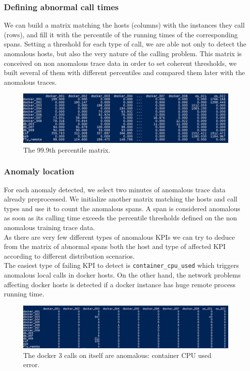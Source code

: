 \documentclass[acmsmall, screen, nonacm]{acmart}
\begin{document}
\subsubsection*{Defining abnormal call times}
We can build a matrix matching the hosts (columns) with the instances they call (rows), and fill it with the percentile of the running times of the corresponding spans. Setting a threshold for each type of call, we are able not only to detect the anomalous hosts, but also the very nature of the calling problem. This matrix is conceived on non anomalous trace data in order to set coherent thresholds, we built several of them with different percentiles and compared them later with the anomalous traces.

\begin{figure}[h!]
  \centering
  \includegraphics[width=\textwidth]{images/Percentile_matrix.png}
  \caption{The 99.9th percentile matrix.}
  \label{fig:Percentile_matrix}
\end{figure}

\subsubsection*{Anomaly location}
For each anomaly detected, we select two minutes of anomalous trace data already preprocessed. We initialize another matrix matching the hosts and call types and use it to count the anomalous spans. A span is considered anomalous as soon as its calling time exceeds the percentile thresholds defined on the non anomalous training trace data.
\\
As there are very few different types of anomalous KPIs we can try to deduce from the matrix of abnormal spans both the host and type of affected KPI according to different distribution scenarios.
\\
The easiest type of failing KPI to detect is \verb|container_cpu_used| which triggers anomalous local calls in docker hosts.
On the other hand, the network problems affecting docker hosts is detected if a docker instance has huge remote process running time.

\begin{figure}[h!]
  \centering
  \includegraphics[width=\textwidth]{images/Anomaly_location.png}
  \caption{The docker 3 calls on itself are anomalous: container CPU used error.}
  \label{fig:Anomaly_location}
\end{figure}
\end{document}
